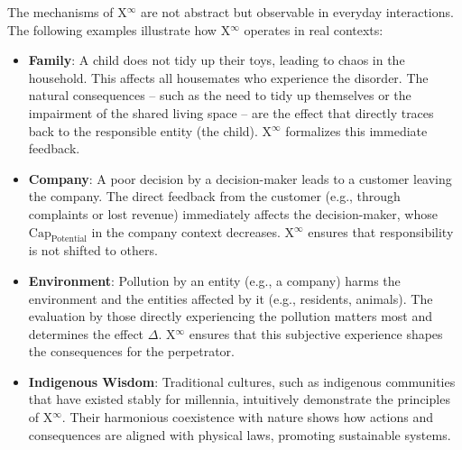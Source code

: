 \documentclass[12pt]{scrartcl}
\begin{document}
The mechanisms of X$^\infty$ are not abstract but observable in everyday interactions. The following examples illustrate how X$^\infty$ operates in real contexts:
\begin{itemize}
    \item \textbf{Family}: A child does not tidy up their toys, leading to chaos in the household. This affects all housemates who experience the disorder. The natural consequences – such as the need to tidy up themselves or the impairment of the shared living space – are the effect that directly traces back to the responsible entity (the child). X$^\infty$ formalizes this immediate feedback.
    \item \textbf{Company}: A poor decision by a decision-maker leads to a customer leaving the company. The direct feedback from the customer (e.g., through complaints or lost revenue) immediately affects the decision-maker, whose $\text{Cap}_{\text{Potential}}$ in the company context decreases. X$^\infty$ ensures that responsibility is not shifted to others.
    \item \textbf{Environment}: Pollution by an entity (e.g., a company) harms the environment and the entities affected by it (e.g., residents, animals). The evaluation by those directly experiencing the pollution matters most and determines the effect $\Delta$. X$^\infty$ ensures that this subjective experience shapes the consequences for the perpetrator.
    \item \textbf{Indigenous Wisdom}: Traditional cultures, such as indigenous communities that have existed stably for millennia, intuitively demonstrate the principles of X$^\infty$. Their harmonious coexistence with nature shows how actions and consequences are aligned with physical laws, promoting sustainable systems.
\end{itemize}
\end{document}

